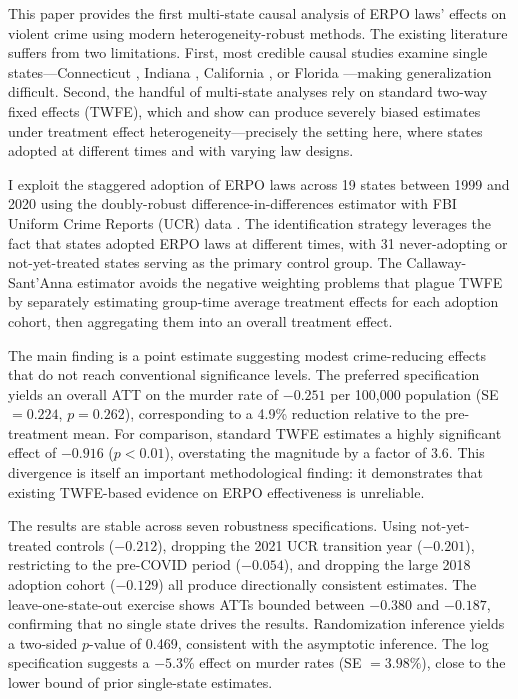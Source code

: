 \documentclass[12pt]{article}
\begin{document}
This paper provides the first multi-state causal analysis of ERPO laws' effects on violent crime using modern heterogeneity-robust methods. The existing literature suffers from two limitations. First, most credible causal studies examine single states---Connecticut \citep{swanson2020erpo}, Indiana \citep{kivisto2015effects}, California \citep{pear2022gvro}, or Florida \citep{florida_erpo2024}---making generalization difficult. Second, the handful of multi-state analyses rely on standard two-way fixed effects (TWFE), which \citet{goodman2021difference} and \citet{dechaisemartin2020two} show can produce severely biased estimates under treatment effect heterogeneity---precisely the setting here, where states adopted at different times and with varying law designs.

I exploit the staggered adoption of ERPO laws across 19 states between 1999 and 2020 using the \citet{callaway2021difference} doubly-robust difference-in-differences estimator with FBI Uniform Crime Reports (UCR) data \citep{kaplan2021ucr}. The identification strategy leverages the fact that states adopted ERPO laws at different times, with 31 never-adopting or not-yet-treated states serving as the primary control group. The Callaway-Sant'Anna estimator avoids the negative weighting problems that plague TWFE by separately estimating group-time average treatment effects for each adoption cohort, then aggregating them into an overall treatment effect.

The main finding is a point estimate suggesting modest crime-reducing effects that do not reach conventional significance levels. The preferred specification yields an overall ATT on the murder rate of $-0.251$ per 100,000 population (SE $= 0.224$, $p = 0.262$), corresponding to a 4.9\% reduction relative to the pre-treatment mean. For comparison, standard TWFE estimates a highly significant effect of $-0.916$ ($p < 0.01$), overstating the magnitude by a factor of 3.6. This divergence is itself an important methodological finding: it demonstrates that existing TWFE-based evidence on ERPO effectiveness is unreliable.

The results are stable across seven robustness specifications. Using not-yet-treated controls ($-0.212$), dropping the 2021 UCR transition year ($-0.201$), restricting to the pre-COVID period ($-0.054$), and dropping the large 2018 adoption cohort ($-0.129$) all produce directionally consistent estimates. The leave-one-state-out exercise shows ATTs bounded between $-0.380$ and $-0.187$, confirming that no single state drives the results. Randomization inference yields a two-sided $p$-value of 0.469, consistent with the asymptotic inference. The log specification suggests a $-5.3\%$ effect on murder rates (SE $= 3.98\%$), close to the lower bound of prior single-state estimates.
\end{document}
